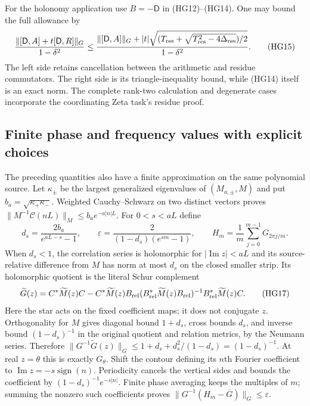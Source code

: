 For the holonomy application use $B=-\mathsf D$ in (HG12)--(HG14).
One may bound the full allowance by
\[
 \frac{\|[\mathsf D,A]+t[\mathsf D,R]\|_G}{1-\delta^2}
 \le\frac{\|[\mathsf D,A]\|_G+
 |t|\sqrt{(T_{\rm res}+
 \sqrt{T_{\rm res}^2-4\Delta_{\rm res}})/2}}{1-\delta^2}.
 \tag{HG15}
\]
The left side retains cancellation between the arithmetic and residue
commutators. The right side is its triangle-inequality bound, while
(HG14) itself is an exact norm. The complete rank-two calculation and
degenerate cases incorporate the coordinating Zeta task's residue proof.

\subsection{Finite phase and frequency values with explicit choices}

The preceding quantities also have a finite approximation on the same
polynomial source. Let $\kappa_\pm$ be the largest generalized
eigenvalues of $(M_{a,\pm},M)$ and put
$b_a=\sqrt{\kappa_+\kappa_-}$. Weighted Cauchy--Schwarz on two
distinct vectors proves
$\|M^{-1}\mathcal C(nL)\|_M\le b_a e^{-a|n|L}$.
For $0<s<aL$ define
\[
 d_s=\frac{2b_a}{e^{aL-s}-1},\qquad
 \varepsilon=\frac{2}{(1-d_s)(e^{sm}-1)},\qquad
 H_m=\frac1m\sum_{j=0}^{m-1}G_{2\pi j/m} .
 \tag{HG16}
\]
When $d_s<1$, the correlation series is holomorphic for
$|\operatorname{Im}z|<aL$ and its source-relative difference from
$M$ has norm at most $d_s$ on the closed smaller strip. Its
holomorphic quotient is the literal Schur complement
\[
 \widetilde G(z)=C^*\widetilde M(z)C-
 C^*\widetilde M(z)B_{\rm rel}
 (B_{\rm rel}^*\widetilde M(z)B_{\rm rel})^{-1}
 B_{\rm rel}^*\widetilde M(z)C .
 \tag{HG17}
\]
Here the star acts on the fixed coefficient maps; it does not conjugate
$z$. Orthogonality for $M$ gives diagonal bound $1+d_s$, cross bounds
$d_s$, and inverse bound $(1-d_s)^{-1}$ in the original quotient and
relation metrics, by the Neumann series. Therefore
$\|G^{-1}\widetilde G(z)\|_G\le
1+d_s+d_s^2/(1-d_s)=(1-d_s)^{-1}$.
At real $z=\theta$ this is exactly $G_\theta$.
Shift the contour defining its $n$th Fourier coefficient to
$\operatorname{Im}z=-s\operatorname{sign}(n)$. Periodicity cancels
the vertical sides and bounds the coefficient by
$(1-d_s)^{-1}e^{-s|n|}$. Finite phase averaging keeps the multiples
of $m$; summing the nonzero such coefficients proves
$\|G^{-1}(H_m-\overline G)\|_G\le\varepsilon$.

